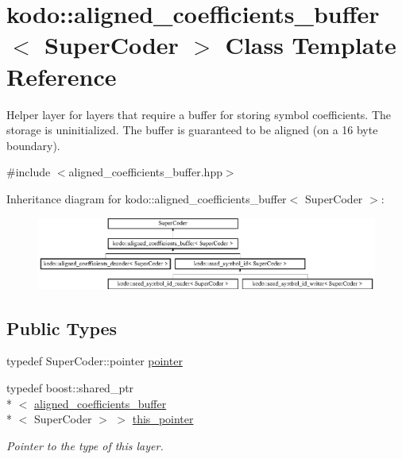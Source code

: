 \hypertarget{classkodo_1_1aligned__coefficients__buffer}{\section{kodo\-:\-:aligned\-\_\-coefficients\-\_\-buffer$<$ Super\-Coder $>$ Class Template Reference}
\label{classkodo_1_1aligned__coefficients__buffer}
}


Helper layer for layers that require a buffer for storing symbol coefficients. The storage is uninitialized. The buffer is guaranteed to be aligned (on a 16 byte boundary).  




{\ttfamily \#include $<$aligned\-\_\-coefficients\-\_\-buffer.\-hpp$>$}

Inheritance diagram for kodo\-:\-:aligned\-\_\-coefficients\-\_\-buffer$<$ Super\-Coder $>$\-:\begin{figure}[H]
\begin{center}
\leavevmode
\includegraphics[height=2.385516cm]{classkodo_1_1aligned__coefficients__buffer}
\end{center}
\end{figure}
\subsection*{Public Types}
\begin{DoxyCompactItemize}
\item 
typedef Super\-Coder\-::pointer \hyperlink{classkodo_1_1aligned__coefficients__buffer_acb8a6277e85aec287e8d55b75d9d194f}{pointer}
\begin{DoxyCompactList}\small\item\em \end{DoxyCompactList}\item 
\hypertarget{classkodo_1_1aligned__coefficients__buffer_a6522051ba0c85adc914e13ecb107ba53}{typedef boost\-::shared\-\_\-ptr\\*
$<$ \hyperlink{classkodo_1_1aligned__coefficients__buffer}{aligned\-\_\-coefficients\-\_\-buffer}\\*
$<$ Super\-Coder $>$ $>$ \hyperlink{classkodo_1_1aligned__coefficients__buffer_a6522051ba0c85adc914e13ecb107ba53}{this\-\_\-pointer}}\label{classkodo_1_1aligned__coefficients__buffer_a6522051ba0c85adc914e13ecb107ba53}

\begin{DoxyCompactList}\small\item\em Pointer to the type of this layer. \end{DoxyCompactList}\end{DoxyCompactItemize}
